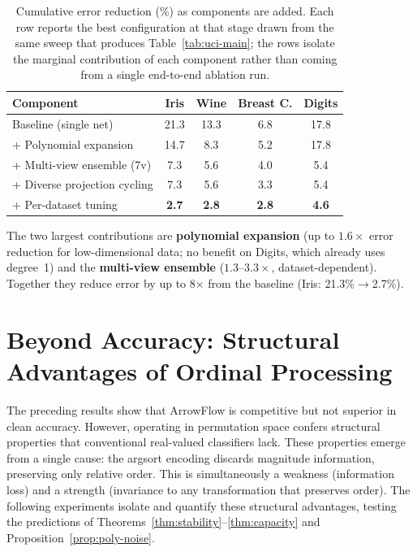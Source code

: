 \documentclass[12pt]{article}
\begin{document}
\begin{table}[ht]
\centering
\caption{Cumulative error reduction (\%) as components are added. Each row reports the best configuration at that stage drawn from the same sweep that produces Table~\ref{tab:uci-main}; the rows isolate the marginal contribution of each component rather than coming from a single end-to-end ablation run.}
\label{tab:progression}
\begin{tabular}{lcccc}
\toprule
Component & Iris & Wine & Breast C. & Digits \\
\midrule
Baseline (single net)           & 21.3 & 13.3 & 6.8 & 17.8 \\
+ Polynomial expansion          & 14.7 & 8.3  & 5.2 & 17.8 \\
+ Multi-view ensemble (7v)      & 7.3  & 5.6  & 4.0 & 5.4  \\
+ Diverse projection cycling    & 7.3  & 5.6  & 3.3 & 5.4  \\
+ Per-dataset tuning            & \textbf{2.7} & \textbf{2.8} & \textbf{2.8} & \textbf{4.6} \\
\bottomrule
\end{tabular}
\end{table}

The two largest contributions are \textbf{polynomial expansion} (up to $1.6\times$ error reduction for low-dimensional data; no benefit on Digits, which already uses degree~1) and the \textbf{multi-view ensemble} ($1.3$--$3.3\times$, dataset-dependent). Together they reduce error by up to 8$\times$ from the baseline (Iris: 21.3\%$\to$2.7\%).


\section{Beyond Accuracy: Structural Advantages of Ordinal Processing}
\label{sec:utility}

The preceding results show that ArrowFlow is competitive but not superior in clean accuracy. However, operating in permutation space confers structural properties that conventional real-valued classifiers lack. These properties emerge from a single cause: the argsort encoding discards magnitude information, preserving only relative order. This is simultaneously a weakness (information loss) and a strength (invariance to any transformation that preserves order). The following experiments isolate and quantify these structural advantages, testing the predictions of Theorems~\ref{thm:stability}--\ref{thm:capacity} and Proposition~\ref{prop:poly-noise}.
\end{document}
